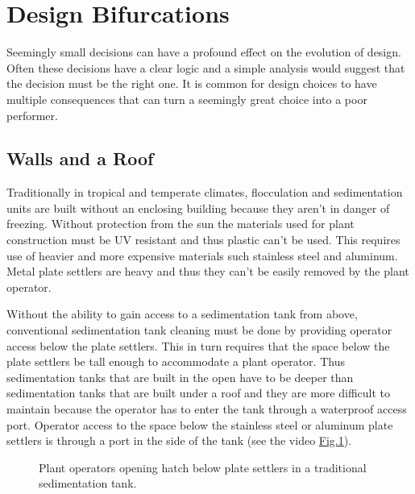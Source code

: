 \documentclass[letterpaper,10pt,english]{sphinxmanual}
\let\sphinxpxdimen\pdfpxdimen\else\newdimen\sphinxpxdimen
\begin{document}
\section{Design Bifurcations}
\label{\detokenize{Introduction/Introduction:design-bifurcations}}\label{\detokenize{Introduction/Introduction:heading-design-bifurcations}}
Seemingly small decisions can have a profound effect on the evolution of design. Often these decisions have a clear logic and a simple analysis would suggest that the decision must be the right one. It is common for design choices to have multiple consequences that can turn a seemingly great choice into a poor performer.


\subsection{Walls and a Roof}
\label{\detokenize{Introduction/Introduction:walls-and-a-roof}}\label{\detokenize{Introduction/Introduction:heading-walls-and-a-roof}}
Traditionally in tropical and temperate climates, flocculation and sedimentation units are built without an enclosing building because they aren’t in danger of freezing. Without protection from the sun the materials used for plant construction must be UV resistant and thus plastic can’t be used. This requires use of heavier and more expensive materials such stainless steel and aluminum. Metal plate settlers are heavy and thus they can’t be easily removed by the plant operator.

Without the ability to gain access to a sedimentation tank from above, conventional sedimentation tank cleaning must be done by providing operator access below the plate settlers. This in turn requires that the space below the plate settlers be tall enough to accommodate a plant operator. Thus sedimentation tanks that are built in the open have to be deeper than sedimentation tanks that are built under a roof and they are more difficult to maintain because the operator has to enter the tank through a waterproof access port. Operator access to the space below the stainless steel or aluminum plate settlers is through a port in the side of the tank (see the video \hyperref[\detokenize{Introduction/Introduction:figure-cleaning-a-sed-tank-with-fixed-plates}]{Fig.\@ \ref{\detokenize{Introduction/Introduction:figure-cleaning-a-sed-tank-with-fixed-plates}}}).

\begin{figure}[htbp]
\centering
\capstart
\sphinxhref{http://www.youtube.com/watch?v=TSh-ZNqaW8Y}{\sphinxincludegraphics[width=300\sphinxpxdimen]{{0}.jpg}}\caption{Plant operators opening hatch below plate settlers in a traditional sedimentation tank.}\label{\detokenize{Introduction/Introduction:id23}}\label{\detokenize{Introduction/Introduction:figure-cleaning-a-sed-tank-with-fixed-plates}}\end{figure}
\end{document}
